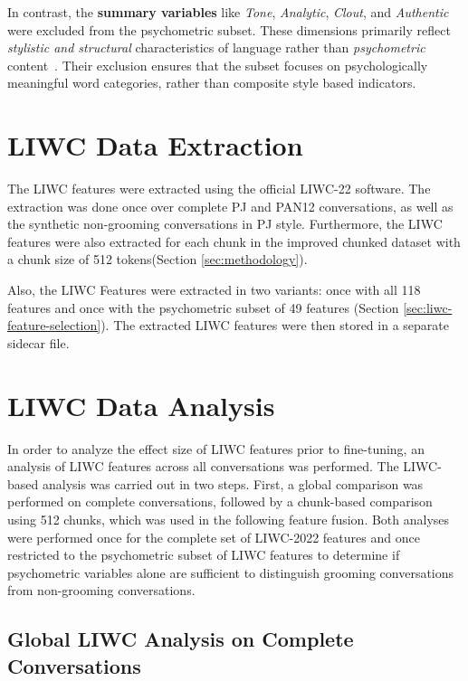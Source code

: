 In contrast, the \textbf{summary variables} like \textit{Tone}, \textit{Analytic}, \textit{Clout}, and \textit{Authentic} were excluded from the psychometric subset. These dimensions primarily reflect \textit{stylistic and structural} characteristics of language rather than \textit{psychometric} content~\cite{pennebaker2022liwc,tausczik2010psychological}. 
Their exclusion ensures that the subset focuses on psychologically meaningful word categories, rather than composite style based indicators. 


\section{LIWC Data Extraction}
The LIWC features were extracted using the official LIWC-22 software. The extraction was done once over complete PJ and PAN12 conversations, as well as the synthetic non-grooming conversations in PJ style. Furthermore, the LIWC features were also extracted for each chunk in the improved chunked dataset with a chunk size of 512 tokens(Section \ref{sec:methodology}).

Also, the LIWC Features were extracted in two variants: once with all 118 features and once with the psychometric subset of 49 features (Section \ref{sec:liwc-feature-selection}). The extracted LIWC features were then stored in a separate sidecar file.

\section{LIWC Data Analysis}

In order to analyze the effect size of LIWC features prior to fine-tuning, an analysis of LIWC features across all conversations was performed.
The LIWC-based analysis was carried out in two steps. First, a global comparison was performed on complete conversations, followed by a chunk-based comparison using 512 chunks, which was used in the following feature fusion. Both analyses were performed once for the complete set of LIWC-2022 features and once restricted to the psychometric subset of LIWC features to determine if psychometric variables alone are sufficient to distinguish grooming conversations from non-grooming conversations.


\subsection{Global LIWC Analysis on Complete Conversations}

